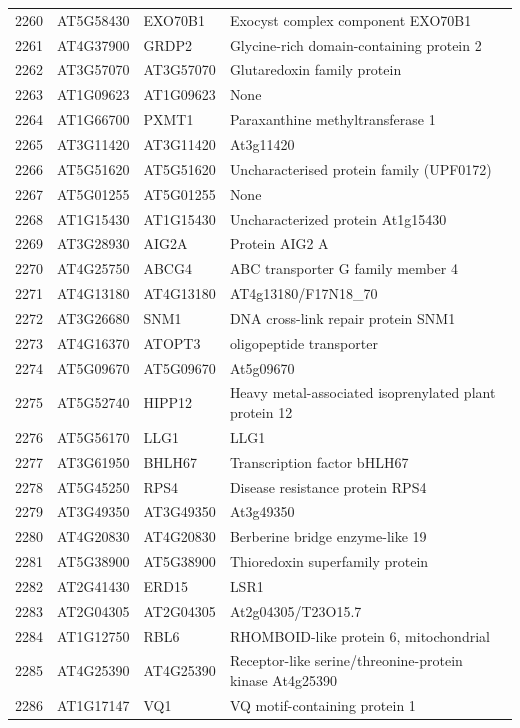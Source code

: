 \documentclass[11pt]{article}
\begin{document}
\begin{center}
\begin{tabular}{rlll}
2260 & AT5G58430 & EXO70B1 & Exocyst complex component EXO70B1\\
2261 & AT4G37900 & GRDP2 & Glycine-rich domain-containing protein 2\\
2262 & AT3G57070 & AT3G57070 & Glutaredoxin family protein\\
2263 & AT1G09623 & AT1G09623 & None\\
2264 & AT1G66700 & PXMT1 & Paraxanthine methyltransferase 1\\
2265 & AT3G11420 & AT3G11420 & At3g11420\\
2266 & AT5G51620 & AT5G51620 & Uncharacterised protein family (UPF0172)\\
2267 & AT5G01255 & AT5G01255 & None\\
2268 & AT1G15430 & AT1G15430 & Uncharacterized protein At1g15430\\
2269 & AT3G28930 & AIG2A & Protein AIG2 A\\
2270 & AT4G25750 & ABCG4 & ABC transporter G family member 4\\
2271 & AT4G13180 & AT4G13180 & AT4g13180/F17N18\_70\\
2272 & AT3G26680 & SNM1 & DNA cross-link repair protein SNM1\\
2273 & AT4G16370 & ATOPT3 & oligopeptide transporter\\
2274 & AT5G09670 & AT5G09670 & At5g09670\\
2275 & AT5G52740 & HIPP12 & Heavy metal-associated isoprenylated plant protein 12\\
2276 & AT5G56170 & LLG1 & LLG1\\
2277 & AT3G61950 & BHLH67 & Transcription factor bHLH67\\
2278 & AT5G45250 & RPS4 & Disease resistance protein RPS4\\
2279 & AT3G49350 & AT3G49350 & At3g49350\\
2280 & AT4G20830 & AT4G20830 & Berberine bridge enzyme-like 19\\
2281 & AT5G38900 & AT5G38900 & Thioredoxin superfamily protein\\
2282 & AT2G41430 & ERD15 & LSR1\\
2283 & AT2G04305 & AT2G04305 & At2g04305/T23O15.7\\
2284 & AT1G12750 & RBL6 & RHOMBOID-like protein 6, mitochondrial\\
2285 & AT4G25390 & AT4G25390 & Receptor-like serine/threonine-protein kinase At4g25390\\
2286 & AT1G17147 & VQ1 & VQ motif-containing protein 1\\

\end{tabular}
\end{center}
\end{document}
